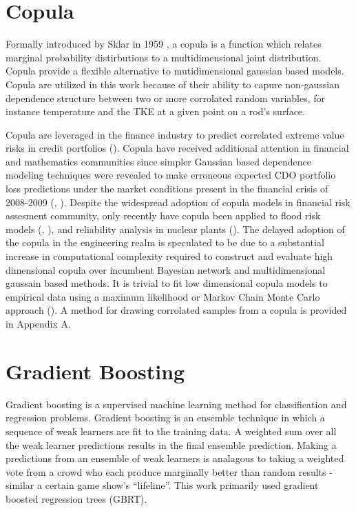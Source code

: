 \section{Copula}

Formally introduced by Sklar in 1959 \citep{Sklar1959}, a copula is a function which relates marginal probability distirbutions to a multidimensional joint distribution.  Copula provide a flexible alternative to mutidimensional gaussian based models.  Copula are utilized in this work because of their ability to capure non-gaussian dependence structure between two or more corrolated random variables, for instance temperature and the TKE at a given point on a rod's surface.  

Copula are leveraged in the finance industry to
predict correlated extreme value risks in credit portfolios
(\citep{Geidosch2016}).  Copula have received additional attention in financial and mathematics communities since 
simpler Gaussian based dependence modeling techniques were revealed to make erroneous expected CDO portfolio loss predictions under the market conditions present in the financial crisis of
2008-2009 (\citep{MacKenzie2013}, \citep{Li2000}).  Despite the widespread adoption of copula models in financial risk assesment community, only recently have copula been applied to flood risk
models (\cite{Dupuis2007}, \cite{Ganguli2012}), and reliability analysis in nuclear plants
(\cite{Kelly2007}).  The delayed adoption of the copula in the
engineering realm is speculated to be due to a substantial increase in computational
complexity required to construct and evaluate high dimensional copula over
incumbent Bayesian network and multidimensional gaussain based methods.  
It is trivial to fit low dimensional copula models to empirical data
using a maximum likelihood or Markov Chain Monte Carlo approach (\cite{Jouini1996}).
A method for drawing corrolated samples from a copula is provided in Appendix A.

\section{Gradient Boosting}

Gradient boosting is a supervised machine learning method for classification and regression problems.  
Gradient boosting is an ensemble technique in which a sequence of weak learners are fit to the training data.  A weighted sum over all the weak learner predictions results in the final ensemble prediction.  Making a predictions from an ensemble of weak learners is analagous to taking a weighted vote from a crowd who each produce marginally better than random results - similar a certain game show's ``lifeline''.  This work primarily used gradient boosted regression trees (GBRT).

